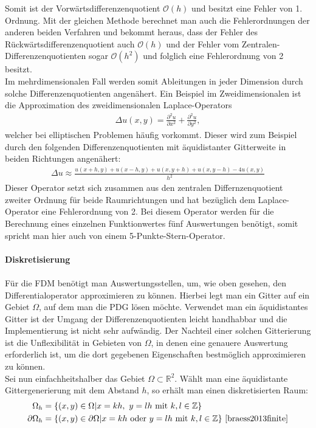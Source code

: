 \documentclass[a4paper,11pt]{article}
\begin{document}
Somit ist der Vorwärtsdifferenzenquotient $\mathcal{O}(h)$ und besitzt eine Fehler von 1. Ordnung. Mit der gleichen Methode berechnet man auch die Fehlerordnungen der anderen beiden Verfahren und bekommt heraus, dass der Fehler des Rückwärtsdifferenzenquotient auch $\mathcal{O}(h)$ und der Fehler vom Zentralen-Differenzenquotienten sogar $\mathcal{O}(h^2)$ und folglich eine Fehlerordnung von 2 besitzt.\\
Im mehrdimensionalen Fall werden somit Ableitungen in jeder Dimension durch solche Differenzenquotienten angenähert. Ein Beispiel im Zweidimensionalen ist die Approximation des zweidimensionalen Laplace-Operators
\begin{align}
 \Delta u(x,y)=\frac{\partial^2u}{\partial x^2}+\frac{\partial^2u}{\partial y^2},
\end{align}
welcher bei elliptischen Problemen häufig vorkommt. Dieser wird zum Beispiel durch den folgenden Differenzenquotienten mit äquidistanter Gitterweite in beiden Richtungen angenähert:
\begin{align}
 \Delta u\approx\frac{u(x+h,y)+u(x-h,y)+u(x,y+h)+u(x,y-h)-4u(x,y)}{h^2}
\end{align}
Dieser Operator setzt sich zusammen aus den zentralen Differnzenquotient zweiter Ordnung für beide Raumrichtungen und hat bezüglich dem Laplace-Operator eine Fehlerordnung von 2. Bei diesem Operator werden für die Berechnung eines einzelnen Funktionwertes fünf Auswertungen benötigt, somit spricht man hier auch von einem 5-Punkte-Stern-Operator.\\\\
\textbf{Diskretisierung}\\\\
Für die FDM benötigt man Auswertungsstellen, um, wie oben gesehen, den Differentialoperator approximieren zu können. Hierbei legt man ein Gitter auf ein Gebiet $\Omega$, auf dem man die PDG lösen möchte. Verwendet man ein äquidistantes Gitter ist der Umgang der Differenzenquotienten leicht handhabbar und die Implementierung ist nicht sehr aufwändig. Der Nachteil einer solchen Gitterierung ist die Unflexibilität in Gebieten von $\Omega$, in denen eine genauere Auswertung erforderlich ist, um die dort gegebenen Eigenschaften bestmöglich approximieren zu können.\\
Sei nun einfachheitshalber das Gebiet $\Omega\subset\mathbb{R}^2$. Wählt man eine äquidistante Gittergenerierung mit dem Abstand $h$, so erhält man einen diskretisierten Raum:
\begin{align}
 \Omega_h&=\{(x,y)\in\Omega|x=kh,~y=lh~\text{mit}~k,l\in\mathbb{Z}\}\nonumber\\
 \partial\Omega_h&=\{(x,y)\in\partial\Omega|x=kh~\text{oder}~y=lh~\text{mit}~k,l\in\mathbb{Z}\}\nonumber~\cite{braess2013finite}
\end{align}
\end{document}
